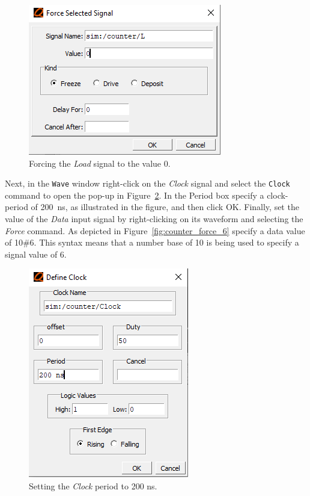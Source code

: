 \documentclass[11pt, twoside, pdftex]{article}
\begin{document}
\begin{figure}[H]
   \begin{center}
      \includegraphics[scale=.75]{figures/counter_force_0.png}
       \caption{Forcing the {\it Load} signal to the value 0.} 
	 \label{fig:counter_force_0}
	 \end{center}
\end{figure}

Next, in the \texttt{Wave} window right-click on the {\it Clock} signal and select the 
\texttt{Clock} command to open the pop-up in Figure~\ref{fig:counter_clock_200}. In the {\sf Period} box
specify a clock-period of 200~ns, as illustrated in the figure, and then click {\sf OK}. Finally, set the
value of the {\it Data} input signal by right-clicking on its waveform and selecting the {\it Force} command.
As depicted in Figure~\ref{fig:counter_force_6} specify a data value of 10\#6. This syntax means that a number
base of 10 is being used to specify a signal value of 6.

\begin{figure}[H]
   \begin{center}
      \includegraphics[scale=.75]{figures/counter_clock_200.png}
       \caption{Setting the {\it Clock} period to 200 ns.} 
	 \label{fig:counter_clock_200}
	 \end{center}
\end{figure}
\end{document}
